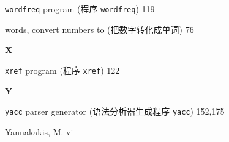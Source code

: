 \begin{multicols}{2}
\hangindent=2pc  \verb'wordfreq' program (程序 \verb'wordfreq') 119

\hangindent=2pc  words, convert numbers to (把数字转化成单词) 76

\medskip\textbf{\large{X}}

\hangindent=2pc  \verb'xref' program (程序 \verb'xref') 122

\medskip\textbf{\large{Y}}

\hangindent=2pc  \verb'yacc' parser generator
(语法分析器生成程序 \verb'yacc') 152,175

\hangindent=2pc  Yannakakis, M. vi

\end{multicols}
